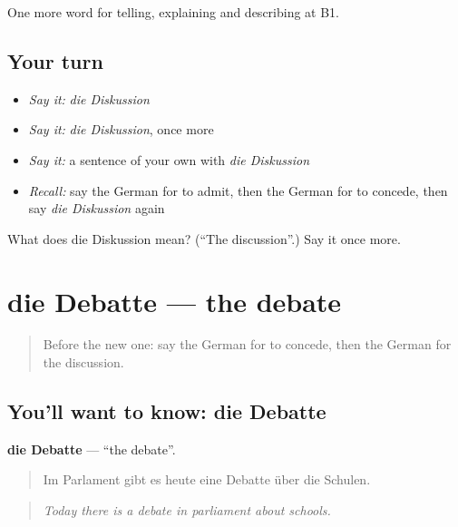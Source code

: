 \begin{grammarlens}[title={What you've built}]
One more word for telling, explaining and describing at B1.
\end{grammarlens}

\subsection*{Your turn}
\begin{itemize}
\raggedright
  \item \emph{Say it:} \emph{die Diskussion}
  \item \emph{Say it:} \emph{die Diskussion}, once more
  \item \emph{Say it:} a sentence of your own with \emph{die Diskussion}
  \item \emph{Recall:} say the German for to admit, then the German for to concede, then say \emph{die Diskussion} again
\end{itemize}

\begin{tcolorbox}[breakable,colback=teal!4,colframe=teal!35!black,title={Before you move on}]
What does die Diskussion mean? (\textquotedblleft{}The discussion\textquotedblright{}.) Say it once more.
\end{tcolorbox}
\section[die Debatte]{die Debatte — the debate}

\label{lesson:GE-C335-debatte}



\begin{quote}
Before the new one: say the German for to concede, then the German for the discussion.
\end{quote}

\subsection*{You'll want to know: die Debatte}
\textbf{die Debatte} — \textquotedblleft{}the debate\textquotedblright{}.

\begin{quote}
Im Parlament gibt es heute eine Debatte über die Schulen.
\end{quote}

\begin{quote}
\emph{Today there is a debate in parliament about schools.}
\end{quote}

